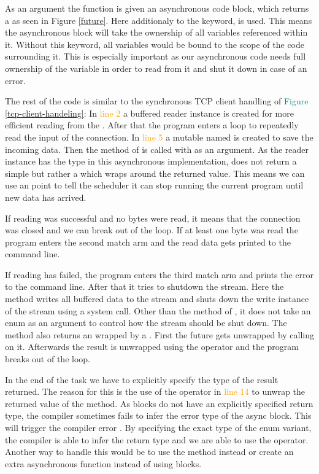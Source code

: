 As an argument the function is given an asynchronous code block, which returns a  as seen in Figure
\textcolor{teal}{\ref{future}}. Here additionaly to the  keyword,  is used. This means the
asynchronous block will take the ownership of all variables referenced within it. Without this keyword, all variables
would be bound to the scope of the code surrounding it. This is especially important as our asynchronous code needs
full ownership of the  variable in order to read from it and shut it down in case of an error.

The rest of the code is similar to the synchronous TCP client handling of
\textcolor{teal}{Figure \ref{tcp-client-handeling}}: In \textcolor{orange}{line 2} a buffered reader instance is
created for more efficient reading from the . After that the program enters a loop to repeatedly read
the input of the connection. In \textcolor{orange}{line 5} a mutable  named  is created to save
the incoming data. Then the method  of  is called with  as an argument. As the
reader instance has the type  in this asynchronous implementation,  does not
return a simple  but rather a  which wraps around the returned value. This means we can use
an  point to tell the scheduler it can stop running the current program until new data has arrived.

If reading was successful and no bytes were read, it means that the connection was closed and we can break out of the
loop. If at least one byte was read the program enters the second match arm and the read data gets printed to the
command line.

If reading has failed, the program enters the third match arm and prints the error to the command line. After that it
tries to shutdown the stream. Here the  method writes all buffered data to the stream and shuts down the
write instance of the stream using a system call. Other than the  method of ,
it does not take an enum as an argument to control how the stream should be shut down. The method also returns an
 wrapped by a . First the future gets unwrapped by calling  on it. Afterwards the
result is unwrapped using the  operator and the program breaks out of the loop.

In the end of the task we have to explicitly specify the type of the result returned. The reason for this is the use of
the  operator in \textcolor{orange}{line 14} to unwrap the returned value of the  method. As
 blocks do not have an explicitly specified return type, the compiler sometimes fails to infer the error
type of the async block. This will trigger the compiler error . By specifying the
exact type of the  enum variant, the compiler is able to infer the return type and we are able to use the
 operator. Another way to handle this would be to use the  method instead or create an extra
asynchronous function instead of using  blocks. \cite{async-rust}

